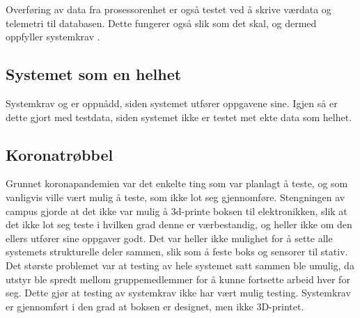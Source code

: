 Overføring av data fra prosessorenhet er også testet ved å skrive værdata og telemetri til databasen. Dette fungerer også slik som det skal, og dermed oppfyller systemkrav .


\subsection{Systemet som en helhet}\label{sec:verifikasjon:helhet}
Systemkrav  og  er oppnådd, siden systemet utfører oppgavene sine. Igjen så er dette gjort med testdata, siden systemet ikke er testet met ekte data som helhet.



\subsection{Koronatrøbbel}

Grunnet koronapandemien var det enkelte ting som var planlagt å teste, og som vanligvis ville vært mulig å teste, som ikke lot seg gjennomføre. Stengningen av campus gjorde at det ikke var mulig å 3d-printe boksen til elektronikken, slik at det ikke lot seg teste i hvilken grad denne er værbestandig, og heller ikke om den ellers utfører sine oppgaver godt. Det var heller ikke mulighet for å sette alle systemets strukturelle deler sammen, slik som å feste boks og sensorer til stativ. Det største problemet var at testing av hele systemet satt sammen ble umulig, da utstyr ble spredt mellom gruppemedlemmer for å kunne fortsette arbeid hver for seg. Dette gjør at testing av systemkrav  ikke har vært mulig testing. Systemkrav  er gjennomført i den grad at boksen er designet, men ikke 3D-printet. 


